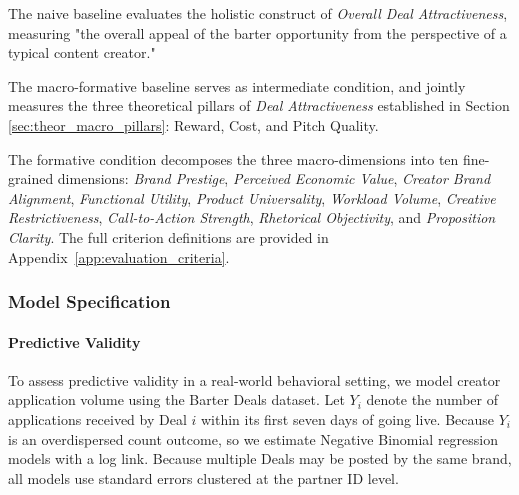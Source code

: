 The naive baseline evaluates the holistic construct of \textit{Overall Deal Attractiveness}, measuring "the overall appeal of the barter opportunity from the perspective of a typical content creator." 

The macro-formative baseline serves as intermediate condition, and jointly measures the three theoretical pillars of \textit{Deal Attractiveness} established in Section \ref{sec:theor_macro_pillars}: Reward, Cost, and Pitch Quality. 

The formative condition decomposes the three macro-dimensions into ten fine-grained dimensions: \textit{Brand Prestige}, \textit{Perceived Economic Value}, \textit{Creator Brand Alignment}, \textit{Functional Utility}, \textit{Product Universality}, \textit{Workload Volume}, \textit{Creative Restrictiveness}, \textit{Call-to-Action Strength}, \textit{Rhetorical Objectivity}, and \textit{Proposition Clarity}. The full criterion definitions are provided in Appendix~\ref{app:evaluation_criteria}.



\subsubsection{Model Specification}

\paragraph{Predictive Validity}
To assess predictive validity in a real-world behavioral setting, we model creator application volume using the Barter Deals dataset. Let $Y_i$ denote the number of applications received by Deal $i$ within its first seven days of going live. Because $Y_i$ is an overdispersed count outcome, so we estimate Negative Binomial regression models with a log link. Because multiple Deals may be posted by the same brand, all models use standard errors clustered at the partner ID level.

